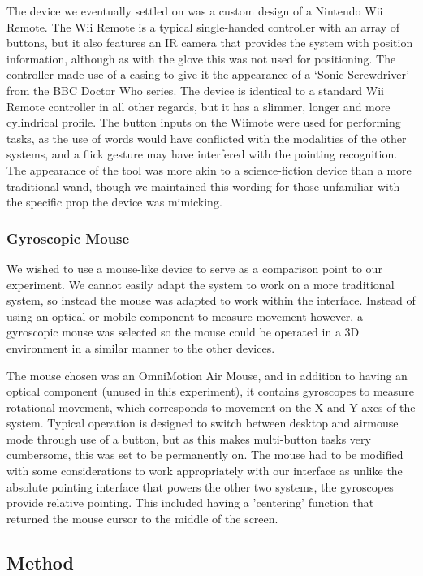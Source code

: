 The device we eventually settled on was a custom design of a Nintendo Wii Remote. The Wii Remote is a typical single-handed controller with an array of buttons, but it also features an IR camera that provides the system with position information, although as with the glove this was not used for positioning. The controller made use of a casing to give it the appearance of a ‘Sonic Screwdriver’ from the BBC Doctor Who series. The device is identical to a standard Wii Remote controller in all other regards, but it has a slimmer, longer and more cylindrical profile. The button inputs on the Wiimote were used for performing tasks, as the use of words would have conflicted with the modalities of the other systems, and a flick gesture may have interfered with the pointing recognition. The appearance of the tool was more akin to a science-fiction device than a more traditional wand, though we maintained this wording for those unfamiliar with the specific prop the device was mimicking.

\subsubsection{Gyroscopic Mouse}

We wished to use a mouse-like device to serve as a comparison point to our experiment. We cannot easily adapt the system to work on a more traditional system, so instead the mouse was adapted to work within the interface. Instead of using an optical or mobile component to measure movement however, a gyroscopic mouse was selected so the mouse could be operated in a 3D environment in a similar manner to the other devices.

The mouse chosen was an OmniMotion Air Mouse, and in addition to having an optical component (unused in this experiment), it contains gyroscopes to measure rotational movement, which corresponds to movement on the X and Y axes of the system. Typical operation is designed to switch between desktop and airmouse mode through use of a button, but as this makes multi-button tasks very cumbersome, this was set to be permanently on. The mouse had to be modified with some considerations to work appropriately with our interface as unlike the absolute pointing interface that powers the other two systems, the gyroscopes provide relative pointing. This included having a 'centering' function that returned the mouse cursor to the middle of the screen.

\subsection{Method}

